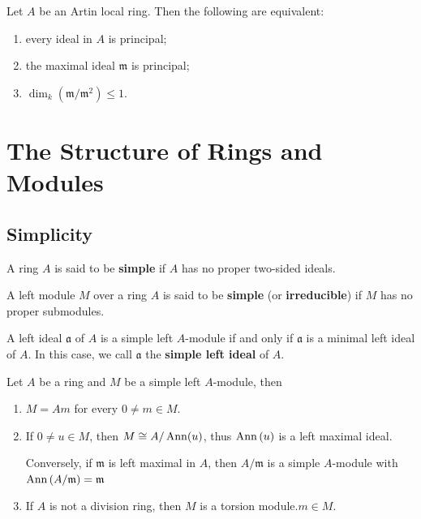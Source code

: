 \begin{proposition}
    Let $A$ be an Artin local ring. Then the following are equivalent:
    \begin{enumerate}
        \item
              every ideal in $A$ is principal;
        \item
              the maximal ideal $\mathfrak{m}$ is principal;
        \item
              $\operatorname{dim}_k\left(\mathfrak{m} / \mathfrak{m}^2\right) \leqslant 1$.
    \end{enumerate}
\end{proposition}








\chapter{The Structure of Rings and Modules} %

\section{Simplicity} %
\begin{definition}
    A ring $A$ is said to be \textbf{simple} if $A$ has no proper two-sided ideals.
\end{definition}

\begin{definition}
    A left module $M$ over a ring $A$ is said to be \textbf{simple} (or \textbf{irreducible}) if $M$ has no proper submodules.
    \begin{remark}
        A left ideal $\mathfrak{a}$ of $A$ is a simple left $A$-module if and only if $\mathfrak{a}$ is a minimal left ideal of $A$.
        In this case, we call $\mathfrak{a}$ the \textbf{simple left ideal} of $A$.
    \end{remark}
\end{definition}
\begin{proposition}
    \label{pro: Proposition of simple module}
    Let $A$ be a ring and $M$ be a simple left $A$-module, then
    \begin{enumerate}
        \item
              $M=Am$ for every $0 \neq m \in M$.
        \item
              If $0 \neq u \in M$, then $M \cong A / \operatorname{\operatorname{Ann}}(u)$, thus $\operatorname{\operatorname{Ann}}\left( u \right)$ is a left maximal ideal.

              Conversely, if $\mathfrak{m}$ is left maximal in $A$, then $A/\mathfrak{m}$ is a simple $A$-module with $\operatorname{\operatorname{Ann}}\left( A/\mathfrak{m} \right)=\mathfrak{m}$
        \item
              If $A$ is not a division ring, then $M$ is a torsion module.$m\in M$.
    \end{enumerate}
\end{proposition}


